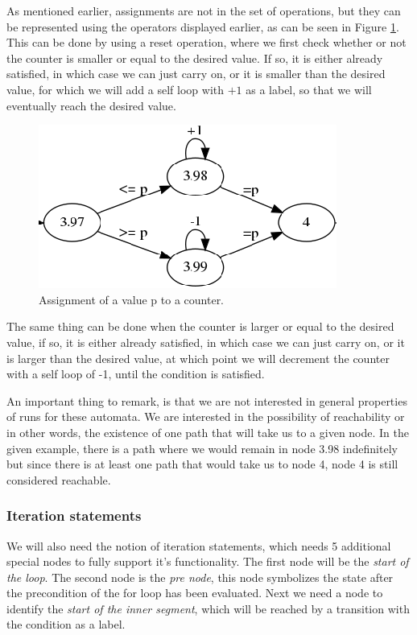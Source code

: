 \documentclass[12pt]{article}
\begin{document}
As mentioned earlier, assignments are not in the set of operations, but they can be represented using the operators displayed earlier, as can be seen in Figure \ref{fig:counter_assignment}. This can be done by using a reset operation, where we first check whether or not the counter is smaller or equal to the desired value. If so, it is either already satisfied, in which case we can just carry on, or it is smaller than the desired value, for which we will add a self loop with $+1$ as a label, so that we will eventually reach the desired value. 
\begin{figure}[h]
	\centering
	\includegraphics[width=0.48\linewidth]{counter_assignment}
	\caption{Assignment of a value p to a counter.}
	\label{fig:counter_assignment}
\end{figure}

The same thing can be done when the counter is larger or equal to the desired value, if so, it is either already satisfied, in which case we can just carry on, or it is larger than the desired value, at which point we will decrement the counter with a self loop of -1, until the condition is satisfied.

An important thing to remark, is that we are not interested in general properties of runs for these automata. We are interested in the possibility of reachability or in other words, the existence of one path that will take us to a given node. In the given example, there is a path where we would remain in node 3.98 indefinitely but since there is at least one path that would take us to node 4, node 4 is still considered reachable.

\subsubsection{Iteration statements}
We will also need the notion of iteration statements, which needs 5 additional special nodes to fully support it's functionality. The first node will be the \textit{start of the loop}. The second node is the \textit{pre node}, this node symbolizes the state after the precondition of the for loop has been evaluated. Next we need a node to identify the \textit{start of the inner segment}, which will be reached by a transition with the condition as a label. 
\end{document}

